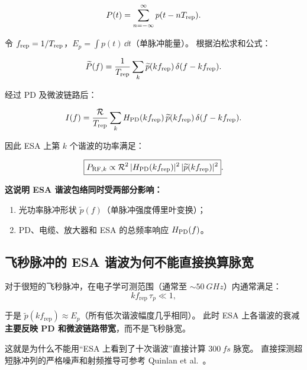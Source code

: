 \documentclass[11pt,a4paper]{article}
\newcommand{\rep}{f_{\text{rep}}}
\newcommand{\pdresp}{\mathcal{R}}
\begin{document}
\begin{equation}\label{eq:pulse_train_power}
P(t) = \sum_{n=-\infty}^{\infty} p(t - nT_{\rm rep}).
\end{equation}

令 $\rep = 1/T_{\rm rep}$，$E_p = \int p(t)\,\dd{t}$（单脉冲能量）。
根据泊松求和公式：

\begin{equation}\label{eq:poisson_rf}
\widetilde{P}(f)
= \frac{1}{T_{\rm rep}} \sum_k \widetilde{p}(k\rep)\,\delta(f - k\rep).
\end{equation}

经过 PD 及微波链路后：

\begin{equation}\label{eq:esa_harmonics}
I(f) = \frac{\pdresp}{T_{\rm rep}} \sum_k H_{\rm PD}(k\rep)\,\widetilde{p}(k\rep)\,\delta(f - k\rep).
\end{equation}

因此 ESA 上第 $k$ 个谐波的功率满足：

\begin{equation}\label{eq:esa_power_k}
\boxed{P_{{\rm RF},k} \propto \pdresp^2\,|H_{\rm PD}(k\rep)|^2\,|\widetilde{p}(k\rep)|^2}.
\end{equation}

\textbf{这说明 ESA 谐波包络同时受两部分影响：}
\begin{enumerate}[label=(\arabic*)]
    \item 光功率脉冲形状 $\widetilde{p}(f)$（单脉冲强度傅里叶变换）；
    \item PD、电缆、放大器和 ESA 的总频率响应 $H_{\rm PD}(f)$。
\end{enumerate}

\subsection{飞秒脉冲的 ESA 谐波为何不能直接换算脉宽}

对于很短的飞秒脉冲，在电子学可测范围（通常至 $\sim\SI{50}{GHz}$）内通常满足：
\begin{equation}\label{eq:narrowband_rf}
k\rep\,\tau_p \ll 1,
\end{equation}

于是 $\widetilde{p}(k\rep) \approx E_p$（所有低次谐波幅度几乎相同）。
此时 ESA 上各谐波的衰减\textbf{主要反映 PD 和微波链路带宽}，而不是飞秒脉宽。

这就是为什么不能用“ESA 上看到了十次谐波”直接计算 $\SI{300}{fs}$ 脉宽。
直接探测超短脉冲列的严格噪声和射频推导可参考 Quinlan et al.\ \cite{Quinlan2013}。
\end{document}
